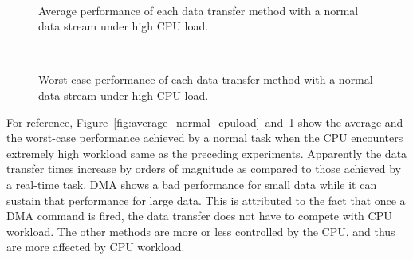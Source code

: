\begin{figure}[!t]
 \begin{center}
  \\
  \caption{Average performance of each data transfer method with a
  normal data stream under high CPU load.}
  \label{fig:average_normal_cpuload}
 \end{center}
 \vspace{0.5em}
 \begin{center}
  \\
  \caption{Worst-case performance of each data transfer method with a
  normal data stream under high CPU load.}
  \label{fig:worst_normal_cpuload}
 \end{center}
\end{figure}

For reference,
Figure~\ref{fig:average_normal_cpuload}~and~\ref{fig:worst_normal_cpuload}
show the average and the worst-case performance achieved by a normal
task when the CPU encounters extremely high workload same as the
preceding experiments.
Apparently the data transfer times increase by orders of magnitude as
compared to those achieved by a real-time task.
\textsf{DMA} shows a bad performance for small data while it can sustain
that performance for large data.
This is attributed to the fact that once a DMA command is fired, the
data transfer does not have to compete with CPU workload.
The other methods are more or less controlled by the CPU, and thus are
more affected by CPU workload.

